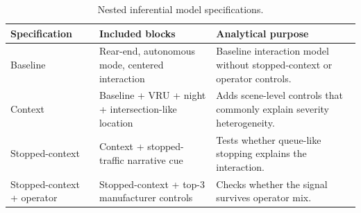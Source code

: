 \begin{table}[H]
\centering
\caption{Nested inferential model specifications.}
\label{tab:model_specs}
\scriptsize
\renewcommand{\arraystretch}{1.08}
\begin{tabular}{p{2.4cm}p{5.0cm}p{5.2cm}}
\toprule
Specification & Included blocks & Analytical purpose \\
\midrule
Baseline & Rear-end, autonomous mode, centered interaction & Baseline interaction model without stopped-context or operator controls. \\
Context & Baseline + VRU + night + intersection-like location & Adds scene-level controls that commonly explain severity heterogeneity. \\
Stopped-context & Context + stopped-traffic narrative cue & Tests whether queue-like stopping explains the interaction. \\
Stopped-context + operator & Stopped-context + top-3 manufacturer controls & Checks whether the signal survives operator mix. \\
\bottomrule
\end{tabular}
\end{table}

